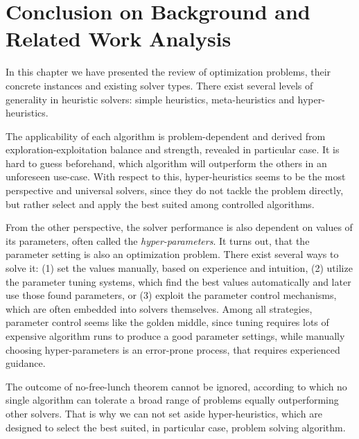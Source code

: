 \section{Conclusion on Background and Related Work Analysis}\label{bg: conclusion}
In this chapter we have presented the review of optimization problems, their concrete instances and existing solver types.
There exist several levels of generality in heuristic solvers: simple heuristics, meta-heuristics and hyper-heuristics.

The applicability of each algorithm is problem-dependent and derived from exploration-exploitation balance and strength, revealed in particular case.
It is hard to guess beforehand, which algorithm will outperform the others in an unforeseen use-case.
With respect to this, hyper-heuristics seems to be the most perspective and universal solvers, since they do not tackle the problem directly, but rather select and apply the best suited among controlled algorithms.

From the other perspective, the solver performance is also dependent on values of its parameters, often called the \textit{hyper-parameters}.
It turns out, that the parameter setting is also an optimization problem.
There exist several ways to solve it: (1) set the values manually, based on experience and intuition, (2) utilize the parameter tuning systems, which find the best values automatically and later use those found parameters, or (3) exploit the parameter control mechanisms, which are often embedded into solvers themselves. 
Among all strategies, parameter control seems like the golden middle, since tuning requires lots of expensive algorithm runs to produce a good parameter settings, while manually choosing hyper-parameters is an error-prone process, that requires experienced guidance.

The outcome of no-free-lunch theorem cannot be ignored, according to which no single algorithm can tolerate a broad range of problems equally outperforming other solvers. That is why we can not set aside hyper-heuristics, which are designed to select the best suited, in particular case, problem solving algorithm.

